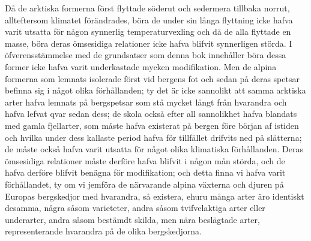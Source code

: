 Då de arktiska formerna först flyttade söderut och sedermera tillbaka norrut, allteftersom klimatet förändrades, böra de under sin långa flyttning icke hafva varit utsatta för någon synnerlig temperaturvexling och då de alla flyttade en masse, böra deras ömsesidiga relationer icke hafva blifvit synnerligen störda. I öfverensstämmelse med de grundsatser som denna bok innehåller böra dessa former icke hafva varit underkastade mycken modifikation. Men de alpina formerna som lemnats isolerade först vid bergens fot och sedan på deras spetsar befinna sig i något olika förhållanden; ty det är icke sannolikt att samma arktiska arter hafva lemnats på bergspetsar som stå mycket långt från hvarandra och hafva lefvat qvar sedan dess; de skola också efter all sannolikhet hafva blandats med gamla fjellarter, som måste hafva existerat på bergen före början af istiden och hvilka under dess kallaste period hafva för tillfället drifvits ned på slätterna; de måste också hafva varit utsatta för något olika klimatiska förhållanden. Deras ömsesidiga relationer måste derföre hafva blifvit i någon mån störda, och de hafva derföre blifvit benägna för modifikation; och detta finna vi hafva varit förhållandet, ty om vi jemföra de närvarande alpina växterna och djuren på Europas bergskedjor med hvarandra, så existera, ehuru många arter äro identiskt desamma, några såsom varieteter, andra såsom tvifvelaktiga arter eller underarter, andra såsom bestämdt skilda, men nära beslägtade arter, representerande hvarandra på de olika bergskedjorna.

